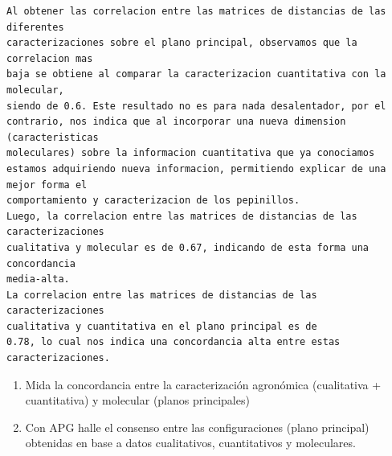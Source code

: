 \documentclass[
]{article}
\newenvironment{Shaded}{\begin{snugshade}}{\end{snugshade}}
\newcommand{\DataTypeTok}[1]{\textcolor[rgb]{0.13,0.29,0.53}{#1}}
\newcommand{\DecValTok}[1]{\textcolor[rgb]{0.00,0.00,0.81}{#1}}
\newcommand{\KeywordTok}[1]{\textcolor[rgb]{0.13,0.29,0.53}{\textbf{#1}}}
\newcommand{\NormalTok}[1]{#1}
\newcommand{\OperatorTok}[1]{\textcolor[rgb]{0.81,0.36,0.00}{\textbf{#1}}}
\newcommand{\OtherTok}[1]{\textcolor[rgb]{0.56,0.35,0.01}{#1}}
\newcommand{\StringTok}[1]{\textcolor[rgb]{0.31,0.60,0.02}{#1}}
\begin{document}
\begin{verbatim}
Al obtener las correlacion entre las matrices de distancias de las diferentes
caracterizaciones sobre el plano principal, observamos que la correlacion mas
baja se obtiene al comparar la caracterizacion cuantitativa con la molecular,
siendo de 0.6. Este resultado no es para nada desalentador, por el
contrario, nos indica que al incorporar una nueva dimension (caracteristicas
moleculares) sobre la informacion cuantitativa que ya conociamos
estamos adquiriendo nueva informacion, permitiendo explicar de una mejor forma el
comportamiento y caracterizacion de los pepinillos. 
Luego, la correlacion entre las matrices de distancias de las caracterizaciones 
cualitativa y molecular es de 0.67, indicando de esta forma una concordancia
media-alta.
La correlacion entre las matrices de distancias de las caracterizaciones 
cualitativa y cuantitativa en el plano principal es de
0.78, lo cual nos indica una concordancia alta entre estas caracterizaciones.
\end{verbatim}

\begin{enumerate}
\def\labelenumi{\Alph{enumi})}
\item
  Mida la concordancia entre la caracterización agronómica (cualitativa
  + cuantitativa) y molecular (planos principales)
\item
  Con APG halle el consenso entre las configuraciones (plano principal)
  obtenidas en base a datos cualitativos, cuantitativos y moleculares.
\end{enumerate}

\begin{Shaded}
\end{Shaded}
\end{document}
